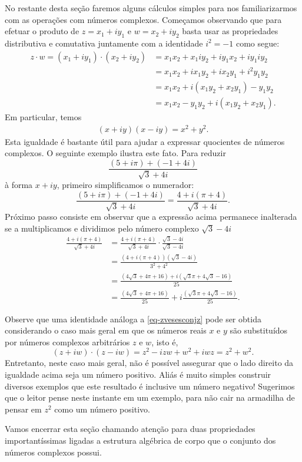 No restante desta seção faremos alguns cálculos simples para nos familiarizarmos com as operações
com números complexos. Começamos observando que para efetuar o produto de $z=x_1+iy_1$ 
e $w=x_2+iy_2$ basta usar as propriedades distributiva e comutativa juntamente 
com a identidade $i^2=-1$ como segue:
\begin{align*}
z\cdot w
=
(x_1+iy_1)\cdot(x_2+iy_2) 
&= 
x_1x_2+x_1iy_2+iy_1x_2+iy_1iy_2
\\
&=
x_1x_2+ix_1y_2+ix_2y_1+i^2y_1y_2
\\
&=
x_1x_2+i(x_1y_2+x_2y_1)-y_1y_2
\\
&=
x_1x_2-y_1y_2+i(x_1y_2+x_2y_1).
\end{align*}
Em particular, temos 
\begin{align}\label{eq-zvesesconjz}
(x+iy)(x-iy) = x^2+y^2.
\end{align}
Esta igualdade é bastante útil para ajudar a expressar quocientes de números complexos.
O seguinte exemplo ilustra este fato. Para reduzir
\[
\frac{(5+i\pi)+(-1+4i)}{\sqrt{3}+4i}
\]
à forma $x+iy$, primeiro simplificamos o numerador:
\[
\frac{(5+i\pi)+(-1+4i)}{\sqrt{3}+4i}
=
\frac{4+i(\pi+4)}{\sqrt{3}+4i}.
\]
Próximo passo consiste em observar que a expressão acima permanece inalterada 
se a multiplicamos e dividimos pelo número complexo $\sqrt{3}-4i$ 
\begin{align*}
\frac{4+i(\pi+4)}{\sqrt{3}+4i}
&=
\frac{4+i(\pi+4)}{\sqrt{3}+4i}\cdot 
\frac{\sqrt{3}-4i}{\sqrt{3}-4i}
\\
&=
\frac{(4+i(\pi+4)) (\sqrt{3}-4i)}{3^2+4^2}
\\
&=
\frac{(4\sqrt{3}+4\pi+16)+i(\sqrt{3}\pi+4\sqrt{3}-16)}{25}
\\
&=
\frac{(4\sqrt{3}+4\pi+16)}{25}+i\frac{(\sqrt{3}\pi+4\sqrt{3}-16)}{25}.
\end{align*}

Observe que uma identidade análoga a \eqref{eq-zvesesconjz} pode ser 
obtida considerando o caso mais geral em que os números reais $x$ e $y$ são substituídos por números complexos 
arbitrários $z$ e $w$, isto é, 
\[
(z+iw)\cdot(z-iw) = z^2-izw+w^2+iwz = z^2+w^2.
\]
Entretanto, neste caso mais geral, não é possível assegurar que 
o lado direito da igualdade acima seja um número positivo. Aliás é muito simples
construir diversos exemplos que este resultado é inclusive um número negativo!
Sugerimos que o leitor pense neste instante em um exemplo, 
para não cair na armadilha de pensar em $z^2$ como um número positivo.  

Vamos encerrar esta seção chamando atenção para duas propriedades importantíssimas 
ligadas a estrutura algébrica de corpo que o conjunto dos números complexos possui.

